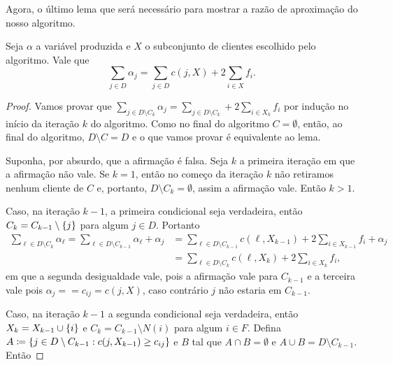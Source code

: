 Agora, o último lema que será necessário para mostrar a razão de aproximação do nosso algoritmo.

\begin{lemma}
\label{greedy:5}
Seja $\alpha$ a variável produzida e $X$ o subconjunto de clientes escolhido pelo algoritmo. Vale que 
\[ \sum_{j \in D} \alpha_j = \sum_{j \in D} c(j,X) + 2\sum_{i \in X} f_i.
\]
\end{lemma}

\begin{proof}
Vamos provar que $\sum_{j \in D \setminus C_k} \alpha_j = \sum_{j \in D \setminus C_k} + 2 \sum_{i \in X_k} f_i$ por indução no início da iteração $k$ do algoritmo. Como no final do algoritmo $C = \emptyset$, então, ao final do algoritmo, $D\setminus C = D$ e o que vamos provar é equivalente ao lema.

Suponha, por absurdo, que a afirmação é falsa. Seja $k$ a primeira iteração em que a afirmação não vale. Se $k=1$, então no começo da iteração $k$ não retiramos nenhum cliente de $C$ e, portanto, $D\setminus C_k = \emptyset$, assim a afirmação vale. Então $k > 1$.

Caso, na iteração $k-1$, a primeira condicional seja verdadeira, então $C_k = C_{k-1} \setminus \{j\}$ para algum $j \in D$. Portanto 
\begin{subequations}
\begin{align*}
 \sum_{\ell \in D \setminus C_k} \alpha_\ell = \sum_{\ell \in D \setminus C_{k-1}} \alpha_\ell  +  \alpha_j &= \sum_{\ell \in D\setminus  C_{k-1}}c(\ell,X_{k-1}) + 2 \sum_{i \in X_{k-1}} f_i + \alpha_j \\
 &= \sum_{\ell \in D\setminus C_{k}}c(\ell,X_k) + 2 \sum_{i \in X_{k}} f_i,
\end{align*}
\end{subequations}
em que a segunda desigualdade vale, pois a afirmação vale para $C_{k-1}$ e a terceira vale pois $\alpha_j = = c_{ij} = c(j,X)$, caso contrário $j$ não estaria em $C_{k-1}$.

Caso, na iteração $k-1$ a segunda condicional seja verdadeira, então $X_k = X_{k-1} \cup \{i\}$ e $C_k = C_{k-1} \setminus N(i)$ para algum $i \in F$. Defina $A\coloneqq \{j \in D\setminus C_{k-1}: c(j,X_{k-1}) \geq c_{ij}\}$ e $B$ tal que $A \cap B = \emptyset$ e $A \cup B = D\setminus C_{k-1}$. Então


\end{proof}
